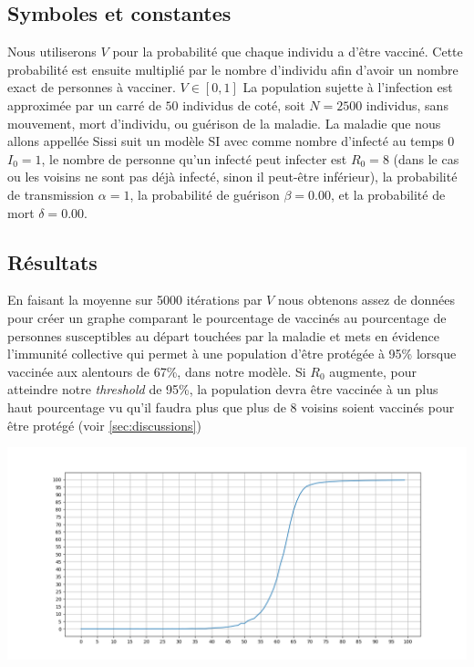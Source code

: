 \documentclass[10pt]{article}
\begin{document}
\subsection{Symboles et constantes}
\label{sec:symboles}
Nous utiliserons $V$ pour la probabilité que chaque individu a d'être vacciné. Cette probabilité est ensuite multiplié par le nombre d'individu afin d'avoir un nombre exact de personnes à vacciner. $V \in [0,1]$
La population sujette à l'infection est approximée par un carré de $50$ individus de coté, soit $N=2500$ individus, sans mouvement, mort d'individu, ou guérison de la maladie.
La maladie que nous allons appellée Sissi suit un modèle SI avec comme nombre d'infecté au temps 0 $I_0 = 1$, le nombre de personne qu'un infecté peut infecter est $R_0 = 8$ (dans le cas ou les voisins ne sont pas déjà infecté, sinon il peut-être inférieur), la probabilité de transmission $\alpha = 1$, la probabilité de guérison $\beta = 0.00$, et la probabilité de mort $\delta = 0.00$.

\subsection{Résultats}
\label{sec:results}
En faisant la moyenne sur 5000 itérations par $V$ nous obtenons assez de données pour créer un graphe comparant le pourcentage de vaccinés au pourcentage de personnes susceptibles au départ touchées par la maladie et mets en évidence l'immunité collective qui permet à une population d'être protégée à 95\% lorsque vaccinée aux alentours de 67\%, dans notre modèle.
Si $R_0$ augmente, pour atteindre notre \textit{threshold} de 95\%, la population devra être vaccinée à un plus haut pourcentage vu qu'il faudra plus que plus de 8 voisins soient vaccinés pour être protégé (voir \ref{sec:discussions})

\includegraphics[scale=0.3]{5000iter.png}
\end{document}
